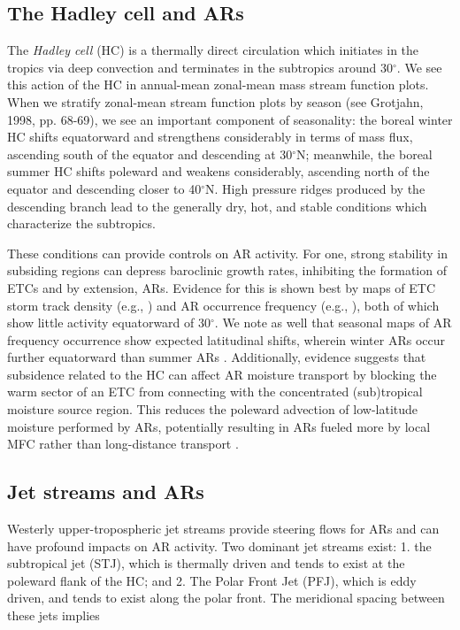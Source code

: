 \documentclass[letterpaper,12pt]{article}
\begin{document}
\subsection{The Hadley cell and ARs}

The \textit{Hadley cell} (HC) is a thermally direct circulation which initiates in the tropics via deep convection and terminates in the subtropics around 30$^\circ$. We see this action of the HC in annual-mean zonal-mean mass stream function plots. When we stratify zonal-mean stream function plots by season (see Grotjahn, 1998, pp. 68-69), we see an important component of seasonality: the boreal winter HC shifts equatorward and strengthens considerably in terms of mass flux, ascending south of the equator and descending at 30$^\circ$N; meanwhile, the boreal summer HC shifts poleward and weakens considerably, ascending north of the equator and descending closer to 40$^\circ$N. High pressure ridges produced by the descending branch lead to the generally dry, hot, and stable conditions which characterize the subtropics. 

These conditions can provide controls on AR activity. For one, strong stability in subsiding regions can depress baroclinic growth rates, inhibiting the formation of ETCs and by extension, ARs. Evidence for this is shown best by maps of ETC storm track density (e.g., \cite{Dacre2009TheCyclones}) and AR occurrence frequency (e.g., \cite{Guan2017}), both of which show little activity equatorward of 30$^\circ$. We note as well that seasonal maps of AR frequency occurrence show expected latitudinal shifts, wherein winter ARs occur further equatorward than summer ARs \cite{Kamae2017AtmosphericVariability}. Additionally, evidence suggests that subsidence related to the HC can affect AR moisture transport by blocking the warm sector of an ETC from connecting with the concentrated (sub)tropical moisture source region. This reduces the poleward advection of low-latitude moisture performed by ARs, potentially resulting in ARs fueled more by local MFC rather than long-distance transport \cite{Bao2006InterpretationMoisture}. 
\subsection{Jet streams and ARs}

Westerly upper-tropospheric jet streams provide steering flows for ARs and can have profound impacts on AR activity. Two dominant jet streams exist: 1. the subtropical jet (STJ), which is thermally driven and tends to exist at the poleward flank of the HC; and 2. The Polar Front Jet (PFJ), which is eddy driven, and tends to exist along the polar front. The meridional spacing between these jets implies 
\end{document}
